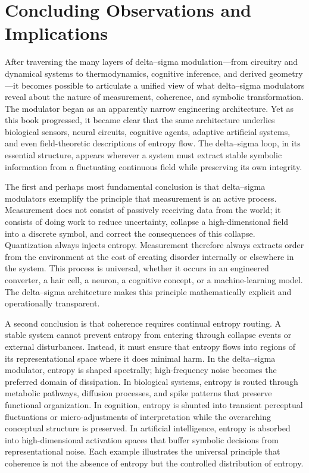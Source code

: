 
\chapter{Concluding Observations and Implications}

After traversing the many layers of delta–sigma modulation—from circuitry and dynamical systems to thermodynamics, cognitive inference, and derived geometry—it becomes possible to articulate a unified view of what delta–sigma modulators reveal about the nature of measurement, coherence, and symbolic transformation. The modulator began as an apparently narrow engineering architecture. Yet as this book progressed, it became clear that the same architecture underlies biological sensors, neural circuits, cognitive agents, adaptive artificial systems, and even field-theoretic descriptions of entropy flow. The delta–sigma loop, in its essential structure, appears wherever a system must extract stable symbolic information from a fluctuating continuous field while preserving its own integrity.

The first and perhaps most fundamental conclusion is that delta–sigma modulators exemplify the principle that measurement is an active process. Measurement does not consist of passively receiving data from the world; it consists of doing work to reduce uncertainty, collapse a high-dimensional field into a discrete symbol, and correct the consequences of this collapse. Quantization always injects entropy. Measurement therefore always extracts order from the environment at the cost of creating disorder internally or elsewhere in the system. This process is universal, whether it occurs in an engineered converter, a hair cell, a neuron, a cognitive concept, or a machine-learning model. The delta–sigma architecture makes this principle mathematically explicit and operationally transparent.

A second conclusion is that coherence requires continual entropy routing. A stable system cannot prevent entropy from entering through collapse events or external disturbances. Instead, it must ensure that entropy flows into regions of its representational space where it does minimal harm. In the delta–sigma modulator, entropy is shaped spectrally; high-frequency noise becomes the preferred domain of dissipation. In biological systems, entropy is routed through metabolic pathways, diffusion processes, and spike patterns that preserve functional organization. In cognition, entropy is shunted into transient perceptual fluctuations or micro-adjustments of interpretation while the overarching conceptual structure is preserved. In artificial intelligence, entropy is absorbed into high-dimensional activation spaces that buffer symbolic decisions from representational noise. Each example illustrates the universal principle that coherence is not the absence of entropy but the controlled distribution of entropy.

